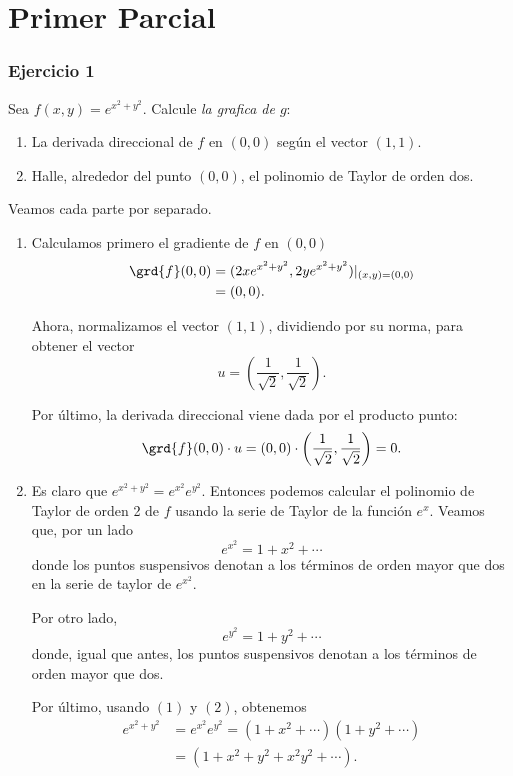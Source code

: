 

 \thispagestyle{plain}
\chapter*{Primer Parcial}
\subsection*{Ejercicio 1}
	Sea $ f(x,y) = e^{x^2+y^2} $. Calcule \textit{la grafica de $g$}: 
\begin{enumerate}
	\item La derivada direccional de $f$ en $(0,0)$ según el vector $(1,1)$.
	\item Halle, alrededor del punto $(0,0)$, el polinomio de Taylor de orden dos.
\end{enumerate}
\begin{sol} Veamos cada parte por separado. 
	\begin{enumerate}
		\item Calculamos primero el gradiente de $f$ en $(0,0)$
		\begin{align*} \grd{f}(0,0) &= (2xe^{x^2+y^2}, 2ye^{x^2+y^2})|_{(x,y) = (0,0)} \\
		&= (0,0).	
		\end{align*}
		
		Ahora, normalizamos el vector $(1,1)$, dividiendo por su norma, para obte\-ner el vector
		\[ u = \left( \frac{1}{\sqrt{2}}, \frac{1}{\sqrt{2}} \right).  \]
		
		Por último, la derivada direccional viene dada por el producto punto:
		\[ \grd{f}(0,0) \cdot u = (0,0) \cdot \left( \frac{1}{\sqrt{2}}, \frac{1}{\sqrt{2}} \right) = 0. \]
		
		\item  Es claro que $e^{x^2+y^2} = e^{x^2} e^{y^2}$. Entonces podemos calcular el polinomio de Taylor de orden 2 de $f$ usando la serie de Taylor de la función $e^x$. Veamos que, por un lado
		\begin{equation}
		e^{x^2} = 1 + x^2 + \cdots
		\end{equation}
		donde los puntos suspensivos denotan a los términos de orden mayor que dos en la serie de taylor de $e^{x^2}$. 
		
		Por otro lado, 
		\begin{equation}
		e^{y^2} = 1 + y^2 + \cdots
		\end{equation}
		donde, igual que antes, los puntos suspensivos denotan a los términos de orden mayor que dos.
		
		Por último, usando $(1)$ y $(2)$, obtenemos
		\begin{align*}
		e^{x^2+y^2} &= e^{x^2}e^{y^2} = (1 + x^2 + \cdots) (1 + y^2 + \cdots) \\
		&= (1 + x^2 + y^2 + x^2y^2 + \cdots).
		\end{align*} 
	\end{enumerate}
\end{sol}

